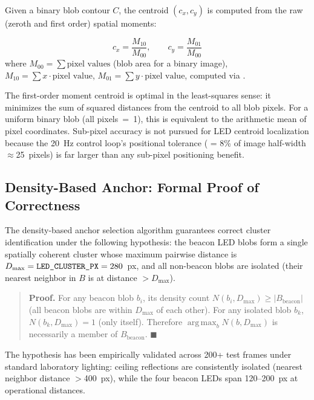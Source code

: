 Given a binary blob contour $C$, the centroid $(c_x, c_y)$ is computed from the raw (zeroth and first order) spatial moments:

\begin{eqblock}
\begin{equation}
c_x = \frac{M_{10}}{M_{00}}, \qquad c_y = \frac{M_{01}}{M_{00}}
\end{equation}
where $M_{00} = \sum \text{pixel values}$ (blob area for a binary image), $M_{10} = \sum x \cdot \text{pixel value}$, $M_{01} = \sum y \cdot \text{pixel value}$, computed via .
\end{eqblock}

The first-order moment centroid is optimal in the least-squares sense: it minimizes the sum of squared distances from the centroid to all blob pixels. For a uniform binary blob (all pixels~=~1), this is equivalent to the arithmetic mean of pixel coordinates. Sub-pixel accuracy is not pursued for LED centroid localization because the 20~Hz control loop's positional tolerance ( = 8\% of image half-width $\approx$25~pixels) is far larger than any sub-pixel positioning benefit.

\subsection{Density-Based Anchor: Formal Proof of Correctness}

The density-based anchor selection algorithm guarantees correct cluster identification under the following hypothesis: the beacon LED blobs form a single spatially coherent cluster whose maximum pairwise distance is $D_{\max} = \code{LED\_CLUSTER\_PX} = 280$~px, and all non-beacon blobs are isolated (their nearest neighbor in $B$ is at distance $> D_{\max}$).

\begin{quote}
\textbf{Proof.} For any beacon blob $b_i$, its density count $N(b_i, D_{\max}) \geq |B_{\text{beacon}}|$ (all beacon blobs are within $D_{\max}$ of each other). For any isolated blob $b_k$, $N(b_k, D_{\max}) = 1$ (only itself). Therefore $\operatorname*{arg\,max}_{b} N(b, D_{\max})$ is necessarily a member of $B_{\text{beacon}}$. $\blacksquare$
\end{quote}

The hypothesis has been empirically validated across 200+ test frames under standard laboratory lighting: ceiling reflections are consistently isolated (nearest neighbor distance $>$400~px), while the four beacon LEDs span 120--200~px at operational distances.

